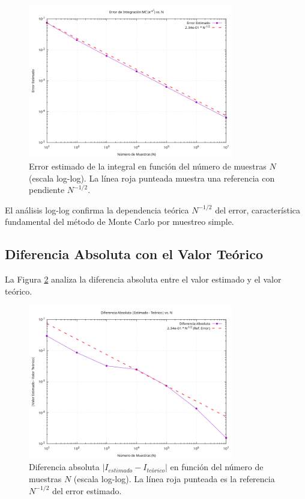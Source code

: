 \documentclass[11pt,a4paper]{article}
\begin{document}
\begin{figure}[h!]
    \centering
    \includegraphics[width=0.8\textwidth]{../results/integral_mc_exp_neg_x2_error_vs_N.png}
    \caption{Error estimado de la integral en función del número de muestras $N$ (escala log-log). La línea roja punteada muestra una referencia con pendiente $N^{-1/2}$.}
    \label{fig:integral_error}
\end{figure}

El análisis log-log confirma la dependencia teórica $N^{-1/2}$ del error, característica fundamental del método de Monte Carlo por muestreo simple.

\subsection{Diferencia Absoluta con el Valor Teórico}
La Figura \ref{fig:integral_diff_abs} analiza la diferencia absoluta entre el valor estimado y el valor teórico.

\begin{figure}[h!]
    \centering
    \includegraphics[width=0.8\textwidth]{../results/integral_mc_exp_neg_x2_diff_abs_vs_N.png}
    \caption{Diferencia absoluta $|I_{estimado} - I_{teórico}|$ en función del número de muestras $N$ (escala log-log). La línea roja punteada es la referencia $N^{-1/2}$ del error estimado.}
    \label{fig:integral_diff_abs}
\end{figure}
\end{document}
